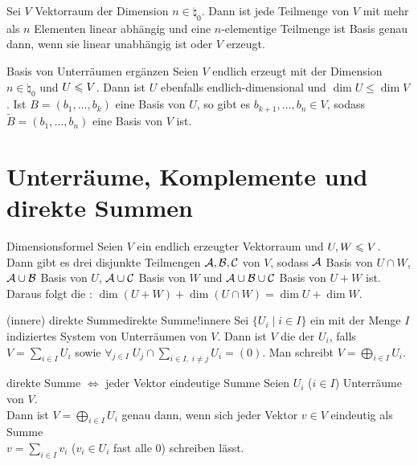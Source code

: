 \begin{Kor}
    Sei $V$ Vektorraum der Dimension $n \in \natural_0$.
    Dann ist jede Teilmenge von $V$ mit mehr als $n$ Elementen linear
    abhängig und eine $n$-elementige Teilmenge ist Basis genau dann,
    wenn sie linear unabhängig ist oder $V$ erzeugt.
\end{Kor}

\begin{Satz}{Basis von Unterräumen ergänzen}
    Seien $V$ endlich erzeugt mit der Dimension $n \in \natural_0$ und
    $U \leqslant V$.
    Dann ist $U$ ebenfalls endlich-dimensional und $\dim U \le \dim V$.
    Ist $B = (b_1, \ldots, b_k)$ eine Basis von $U$, so gibt es
    $b_{k+1}, \ldots, b_n \in V$, sodass $\tilde{B} = (b_1, \ldots, b_n)$
    eine Basis von $V$ ist.
\end{Satz}

\section{%
    Unterräume, Komplemente und direkte Summen%
}

\begin{Satz}{Dimensionsformel}
    Seien $V$ ein endlich erzeugter Vektorraum und $U, W \leqslant V$. \\
    Dann gibt es drei disjunkte Teilmengen
    $\mathcal{A}, \mathcal{B}, \mathcal{C}$ von $V$, sodass
    $\mathcal{A}$ Basis von $U \cap W$,
    $\mathcal{A} \cup \mathcal{B}$ Basis von $U$,
    $\mathcal{A} \cup \mathcal{C}$ Basis von $W$ und
    $\mathcal{A} \cup \mathcal{B} \cup \mathcal{C}$ Basis von $U + W$ ist. \\
    Daraus folgt die :
    $\dim(U + W) + \dim(U \cap W) = \dim U + \dim W$.
\end{Satz}

\begin{xDef}{(innere) direkte Summe}{direkte Summe!innere}
    Sei $\{U_i \;|\; i \in I\}$ ein mit der Menge $I$ indiziertes System von
    Unterräumen von $V$.
    Dann ist $V$ die
     der
    $U_i$, falls $V = \sum_{i \in I} U_i$ sowie
    $\forall_{j \in I}\; U_j \cap \sum_{i \in I,\; i \not= j} U_i = (0)$.
    Man schreibt $V = \bigoplus_{i \in I} U_i$.
\end{xDef}

\begin{Satz}{direkte Summe $\Leftrightarrow$ jeder Vektor eindeutige Summe}
    Seien $U_i$ ($i \in I$) Unterräume von $V$. \\
    Dann ist $V = \bigoplus_{i \in I} U_i$
    genau dann, wenn sich jeder Vektor $v \in V$ eindeutig als Summe \\
    $v = \sum_{i \in I} v_i$
    ($v_i \in U_i$ fast alle $0$) schreiben lässt.
\end{Satz}

